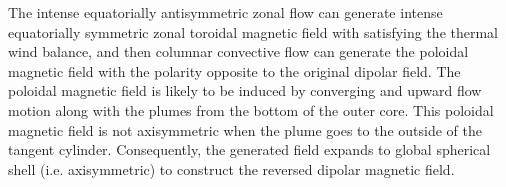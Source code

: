 {The intense equatorially antisymmetric zonal flow can generate intense equatorially symmetric zonal toroidal magnetic field with satisfying the thermal wind balance, and then columnar convective flow can generate the poloidal magnetic field with the polarity opposite to the original dipolar field.
The poloidal magnetic field is likely to be induced by converging and upward flow motion along with the plumes from the bottom of the outer core.
This poloidal magnetic field is not axisymmetric when the plume goes to the outside of the tangent cylinder. 
Consequently, the generated field expands to global spherical shell (i.e. axisymmetric) to construct the reversed dipolar magnetic field.
}
%
%
%
